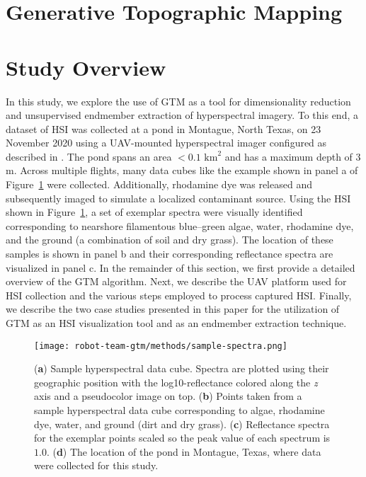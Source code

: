 \section{Generative Topographic Mapping}


\section{Study Overview}


In this study, we explore the use of  GTM as a tool for dimensionality reduction
and unsupervised endmember extraction of hyperspectral imagery. To this end, a
dataset of HSI was collected at a pond in Montague, North Texas, on 23 November
2020 using a UAV-mounted hyperspectral imager configured as described in
\cite{robot-team-1, robot-team-2}. The pond spans an area $<0.1$ $\text{km}^2$
and has a maximum depth of $3$ m. Across multiple flights, many data cubes like
the example shown in panel a of Figure~\ref{fig:sample-spectra} were collected.
Additionally, rhodamine dye was released and subsequently imaged to simulate a
localized contaminant source. Using the HSI shown in
Figure~\ref{fig:sample-spectra}, a set of exemplar spectra were visually
identified corresponding to nearshore filamentous blue--green algae, water,
rhodamine dye, and the ground (a combination of soil and dry grass). The
location of these samples is shown in panel b and their corresponding
reflectance spectra are visualized in panel c.  In the remainder of this
section, we first provide a detailed overview of the GTM algorithm. Next, we
describe the UAV platform used for HSI collection and the various steps employed
to process captured HSI. Finally, we describe the two case studies presented in
this paper for the utilization of  GTM as an HSI visualization tool and as an
endmember extraction technique.



\begin{figure}[H]
  \centering
  \texttt{[image: robot-team-gtm/methods/sample-spectra.png]}
  \caption{(\textbf{a}) Sample hyperspectral data cube. Spectra are plotted
    using their geographic position with the log10-reflectance colored along the
    \emph{z} axis and a pseudocolor image on top. (\textbf{b}) Points taken from
    a sample hyperspectral data cube corresponding to algae, rhodamine dye,
    water, and ground (dirt and dry grass). (\textbf{c}) Reflectance spectra for
    the exemplar points scaled so the peak value of each spectrum is $1.0$.
    (\textbf{d}) The location of the pond in Montague, Texas, where data were
    collected for this study.}
    \label{fig:sample-spectra}
\end{figure}

